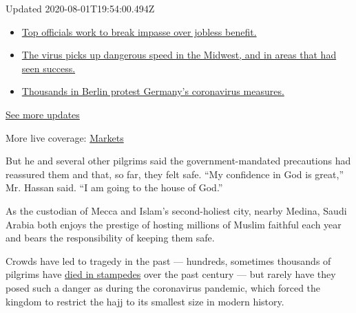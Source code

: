 Updated 2020-08-01T19:54:00.494Z

\begin{itemize}
\tightlist
\item
  \href{https://www.nytimes3xbfgragh.onion/2020/08/01/world/coronavirus-covid-19.html?action=click\&pgtype=Article\&state=default\&region=MAIN_CONTENT_1\&context=storylines_live_updates\#link-3ac56579}{Top
  officials work to break impasse over jobless benefit.}
\item
  \href{https://www.nytimes3xbfgragh.onion/2020/08/01/world/coronavirus-covid-19.html?action=click\&pgtype=Article\&state=default\&region=MAIN_CONTENT_1\&context=storylines_live_updates\#link-8796723}{The
  virus picks up dangerous speed in the Midwest, and in areas that had
  seen success.}
\item
  \href{https://www.nytimes3xbfgragh.onion/2020/08/01/world/coronavirus-covid-19.html?action=click\&pgtype=Article\&state=default\&region=MAIN_CONTENT_1\&context=storylines_live_updates\#link-25930521}{Thousands
  in Berlin protest Germany's coronavirus measures.}
\end{itemize}

\href{https://www.nytimes3xbfgragh.onion/2020/08/01/world/coronavirus-covid-19.html?action=click\&pgtype=Article\&state=default\&region=MAIN_CONTENT_1\&context=storylines_live_updates}{See
more updates}

More live coverage:
\href{https://www.nytimes3xbfgragh.onion/live/2020/07/31/business/stock-market-today-coronavirus?action=click\&pgtype=Article\&state=default\&region=MAIN_CONTENT_1\&context=storylines_live_updates}{Markets}

But he and several other pilgrims said the government-mandated
precautions had reassured them and that, so far, they felt safe. ``My
confidence in God is great,'' Mr. Hassan said. ``I am going to the house
of God.''

As the custodian of Mecca and Islam's second-holiest city, nearby
Medina, Saudi Arabia both enjoys the prestige of hosting millions of
Muslim faithful each year and bears the responsibility of keeping them
safe.

Crowds have led to tragedy in the past --- hundreds, sometimes thousands
of pilgrims have
\href{https://www.nytimes3xbfgragh.onion/interactive/2016/09/06/world/middleeast/2015-hajj-stampede.html?action=click\&module=RelatedLinks\&pgtype=Article}{died
in stampedes} over the past century --- but rarely have they posed such
a danger as during the coronavirus pandemic, which forced the kingdom to
restrict the hajj to its smallest size in modern history.

